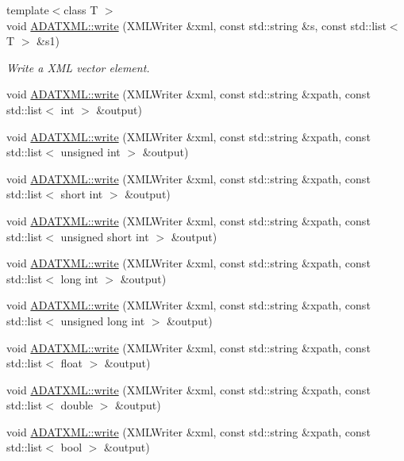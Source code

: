 \begin{DoxyCompactItemize}
\item 
{\footnotesize template$<$class T $>$ }\\void \mbox{\hyperlink{group__io_ga442a3dd5472737a074d3774f46a94f14}{A\+D\+A\+T\+X\+M\+L\+::write}} (X\+M\+L\+Writer \&xml, const std\+::string \&s, const std\+::list$<$ T $>$ \&s1)
\begin{DoxyCompactList}\small\item\em Write a X\+ML vector element. \end{DoxyCompactList}\item 
void \mbox{\hyperlink{group__io_gaab9fb8d6cd603f8b6b5c6b493935eade}{A\+D\+A\+T\+X\+M\+L\+::write}} (X\+M\+L\+Writer \&xml, const std\+::string \&xpath, const std\+::list$<$ int $>$ \&output)
\item 
void \mbox{\hyperlink{group__io_ga6026879ab5fc4a25f24c2f9f88d731b5}{A\+D\+A\+T\+X\+M\+L\+::write}} (X\+M\+L\+Writer \&xml, const std\+::string \&xpath, const std\+::list$<$ unsigned int $>$ \&output)
\item 
void \mbox{\hyperlink{group__io_ga9e8def0c78f0db9648bdf8a6ef4b0832}{A\+D\+A\+T\+X\+M\+L\+::write}} (X\+M\+L\+Writer \&xml, const std\+::string \&xpath, const std\+::list$<$ short int $>$ \&output)
\item 
void \mbox{\hyperlink{group__io_ga9b4ce3375767d9485b3d5dcbf535d4a4}{A\+D\+A\+T\+X\+M\+L\+::write}} (X\+M\+L\+Writer \&xml, const std\+::string \&xpath, const std\+::list$<$ unsigned short int $>$ \&output)
\item 
void \mbox{\hyperlink{group__io_ga323fbb7d576696f27ec4eb34519c1fc7}{A\+D\+A\+T\+X\+M\+L\+::write}} (X\+M\+L\+Writer \&xml, const std\+::string \&xpath, const std\+::list$<$ long int $>$ \&output)
\item 
void \mbox{\hyperlink{group__io_ga1cae344439dcb1355afb4b89f85e7e1b}{A\+D\+A\+T\+X\+M\+L\+::write}} (X\+M\+L\+Writer \&xml, const std\+::string \&xpath, const std\+::list$<$ unsigned long int $>$ \&output)
\item 
void \mbox{\hyperlink{group__io_gaed1b6aaf88e89845ef30099ca6c5d933}{A\+D\+A\+T\+X\+M\+L\+::write}} (X\+M\+L\+Writer \&xml, const std\+::string \&xpath, const std\+::list$<$ float $>$ \&output)
\item 
void \mbox{\hyperlink{group__io_ga9b4f1b7647f914a90edb448dc7fbb4e9}{A\+D\+A\+T\+X\+M\+L\+::write}} (X\+M\+L\+Writer \&xml, const std\+::string \&xpath, const std\+::list$<$ double $>$ \&output)
\item 
void \mbox{\hyperlink{group__io_gaaeb2284c0481b6c39c20d3e2c283d933}{A\+D\+A\+T\+X\+M\+L\+::write}} (X\+M\+L\+Writer \&xml, const std\+::string \&xpath, const std\+::list$<$ bool $>$ \&output)

\end{DoxyCompactItemize}
